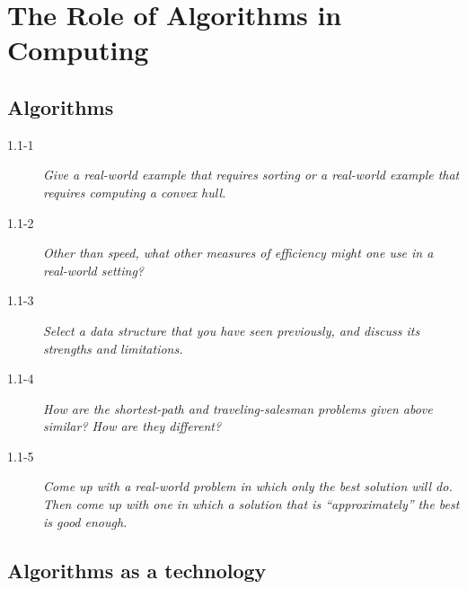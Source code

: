 \section{The Role of Algorithms in Computing}

\subsection{Algorithms}

\begin{description}
  \item[1.1-1] {\itshape Give a real-world example that requires sorting or a real-world example that requires computing a convex hull.}

    \begin{exrev}
      
    \end{exrev}

  \item[1.1-2] {\itshape Other than speed, what other measures of efficiency might one use in a real-world setting?}

    \begin{exrev}
      
    \end{exrev}

  \item[1.1-3] {\itshape Select a data structure that you have seen previously, and discuss its strengths and limitations.}

    \begin{exrev}
      
    \end{exrev}

  \item[1.1-4] {\itshape How are the shortest-path and traveling-salesman problems given above similar? How are they different?}

    \begin{exrev}
      
    \end{exrev}

  \item[1.1-5] {\itshape Come up with a real-world problem in which only the best solution will do. Then come up with one in which a solution that is “approximately” the best is good enough.}


\end{description}

\subsection{Algorithms as a technology}

